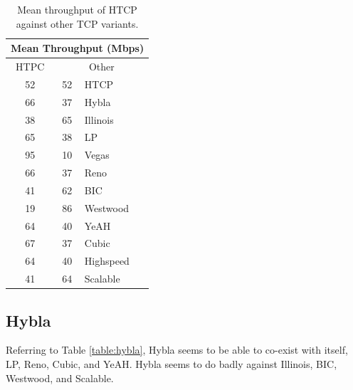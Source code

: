 \documentclass[11pt,a4paper,twocolumn]{article}
\begin{document}
\begin{table}[h!]
	\begin{center}
		\begin{tabular}{| c | c | l |}
    			\hline
			\multicolumn{3}{|c|}{Mean Throughput (Mbps)} \\
    			\hline
    			HTPC &  \multicolumn{2}{|c|}{Other}  \\
			\hline
    			52 & 52 & HTCP \\
			\hline
    			66 & 37 & Hybla \\
			\hline
    			38 & 65 & Illinois \\
			\hline
    			65 & 38 & LP \\
			\hline
    			95 & 10 & Vegas \\
			\hline
    			66 & 37 & Reno \\
			\hline
    			41 & 62 & BIC \\
			\hline
    			19 & 86 & Westwood \\
			\hline
    			64 & 40 & YeAH \\
			\hline
    			67 & 37 & Cubic \\
			\hline
    			64 & 40 & Highspeed \\
			\hline
    			41 & 64 & Scalable \\
    			\hline
    		\end{tabular}
  	\end{center}
  	\caption{Mean throughput of HTCP against other TCP variants.}
	\label{table:htcp}
\end{table}

\subsection{Hybla}
\label{subsec:hybla}
Referring to Table \ref{table:hybla}, Hybla seems to be able to co-exist with itself, LP,
Reno, Cubic, and YeAH. Hybla seems to do badly against Illinois, BIC, Westwood, and Scalable.
\end{document}
